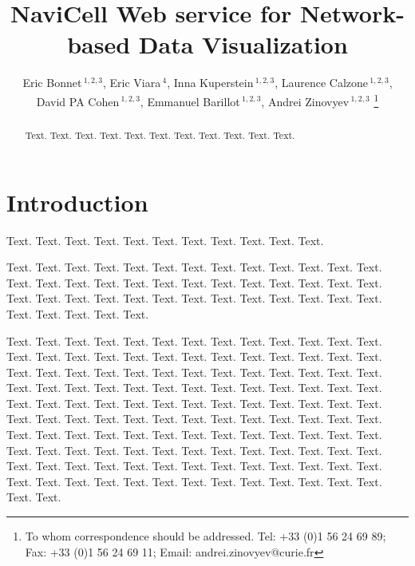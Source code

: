 \documentclass[a4,center,fleqn]{NAR}
\begin{document}
\title{NaviCell Web service for Network-based Data Visualization}


\author{%
Eric Bonnet\,$^{1,2,3}$,
Eric Viara\,$^{4}$,
Inna Kuperstein\,$^{1,2,3}$,
Laurence Calzone\,$^{1,2,3}$,
David PA Cohen\,$^{1,2,3}$,
Emmanuel Barillot\,$^{1,2,3}$,
Andrei Zinovyev\,$^{1,2,3}$%
\footnote{To whom correspondence should be addressed.
Tel: +33 (0)1 56 24 69 89; Fax: +33 (0)1 56 24 69 11; Email: andrei.zinovyev@curie.fr}}

\address{%
$^{1}$Institut Curie, 26 rue d'Ulm, 75248 Paris, France, 
$^{2}$INSERM U900, 75248 Paris, France,
$^{3}$Mines ParisTech, 77300 Fontainebleau, France,
$^{4}$Sysra, 91330 Yerres, France.
}




\maketitle

\begin{abstract}
Text. Text. Text. Text. Text. Text. Text. Text. Text. Text. Text.
\end{abstract}


\section{Introduction}

Text. Text. Text. Text. Text. Text. Text. Text. Text. Text. Text.

Text. Text. Text. Text. Text. Text. Text. Text. Text. Text. Text.
Text. Text. Text. Text. Text. Text. Text. Text. Text. Text. Text.
Text. Text. Text. Text. Text. Text. Text. Text. Text. Text. Text.
Text. Text. Text. Text. Text. Text. Text. Text. Text. Text. Text.

Text. Text. Text. Text. Text. Text. Text. Text. Text. Text. Text.
Text. Text. Text. Text. Text. Text. Text. Text. Text. Text. Text.
Text. Text. Text. Text. Text. Text. Text. Text. Text. Text. Text.
Text. Text. Text. Text. Text. Text. Text. Text. Text. Text. Text.
Text. Text. Text. Text. Text. Text. Text. Text. Text. Text. Text.
Text. Text. Text. Text. Text. Text. Text. Text. Text. Text. Text.
Text. Text. Text. Text. Text. Text. Text. Text. Text. Text. Text.
Text. Text. Text. Text. Text. Text. Text. Text. Text. Text. Text.
Text. Text. Text. Text. Text. Text. Text. Text. Text. Text. Text.
Text. Text. Text. Text. Text. Text. Text. Text. Text. Text. Text.
Text. Text. Text. Text. Text. Text. Text. Text. Text. Text. Text.
Text. Text. Text. Text. Text. Text. Text. Text. Text. Text. Text.
\end{document}
